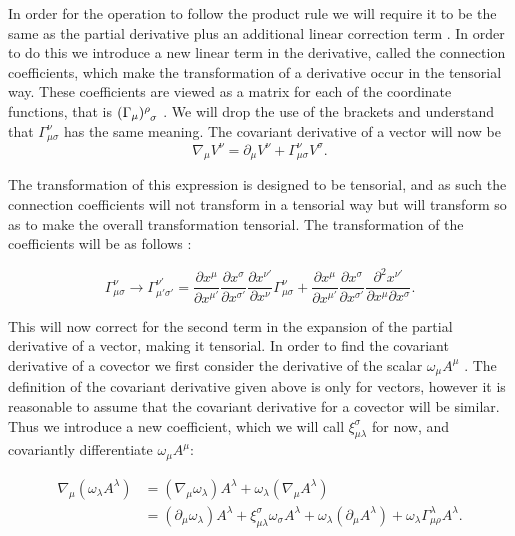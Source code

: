 In order for the operation to follow the product rule we will require it to be the same as the partial derivative plus an additional linear correction term \cite{carroll}. In order to do this we introduce a new linear term in the derivative, called the connection coefficients, which make the transformation of a derivative occur in the tensorial way. These coefficients are viewed as a matrix for each of the coordinate functions, that is \((\Gamma_{\mu})\indices{^\rho_\sigma}\) \cite{carroll}. We will drop the use of the brackets and understand that \(\Gamma^{\nu}_{\mu \sigma}\) has the same meaning. The covariant derivative of a vector will now be
\begin{equation} \label{co-deriv}
	\nabla_{\mu} V^{\nu} = \partial_{\mu} V^{\nu} + \Gamma^{\nu}_{\mu \sigma} V^{\sigma} .
\end{equation}

The transformation of this expression is designed to be tensorial, and as such the connection coefficients will not transform in a tensorial way but will transform so as to make the overall transformation tensorial. The transformation of the coefficients will be as follows \cite{carroll}: 

\begin{equation} \label{connection-transform}
	\Gamma^{\nu}_{\mu \sigma} \rightarrow \Gamma^{\nu'}_{\mu' \sigma'} = \frac{\partial x^{\mu}}{\partial x^{\mu'}} 
	\frac{\partial x^{\sigma}}{\partial x^{\sigma'}} \frac{\partial x^{\nu'}}{\partial x^{\nu}} \Gamma^{\nu}_{\mu \sigma} +
	\frac{\partial x^{\mu}}{\partial x^{\mu'}} \frac{\partial x^{\sigma}}{\partial x^{\sigma'}} \frac{\partial^2 x^{\nu'}}{\partial x^{\mu} \partial x^{\sigma}}
	.
\end{equation}

This will now correct for the second term in the expansion of the partial derivative of a vector, making it tensorial. In order to find the covariant derivative of a covector we first consider the derivative of the scalar \(\omega_{\mu} A^{\mu}\) \cite{carroll}. The definition of the covariant derivative given above is only for vectors, however it is reasonable to assume that the covariant derivative for a covector will be similar. Thus we introduce a new coefficient, which we will call \(\xi^{\sigma}_{\mu \lambda}\) for now, and covariantly differentiate \(\omega_{\mu} A^{\mu}\):

\begin{equation} \label{covar-deriv}
	\begin{aligned}
		\nabla_{\mu} (\omega_{\lambda} A^{\lambda}) &= (\nabla_{\mu} \omega_{\lambda}) A^{\lambda} + \omega_{\lambda} (\nabla_{\mu} A^{\lambda}) \\
		&= (\partial_{\mu} \omega_{\lambda}) A^{\lambda} + \xi^{\sigma}_{\mu \lambda} \omega_{\sigma} A^{\lambda}
		+ \omega_{\lambda} (\partial_{\mu} A^{\lambda}) + \omega_{\lambda} \Gamma^{\lambda}_{\mu \rho} A^{\lambda} .
	\end{aligned}
\end{equation}

